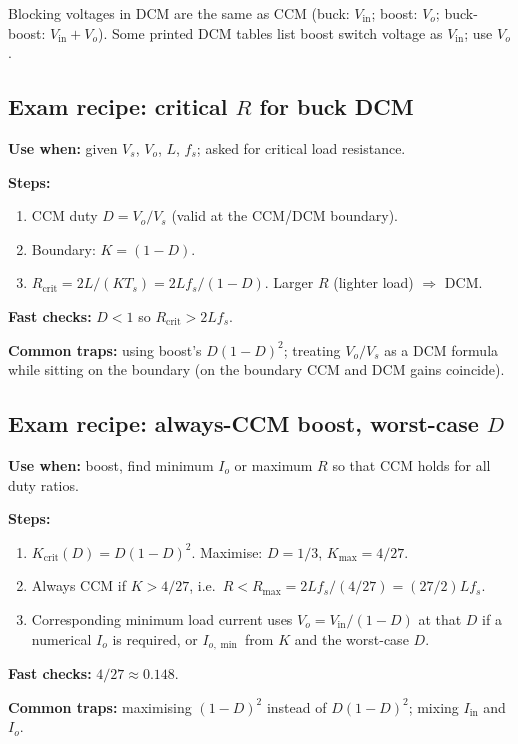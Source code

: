 Blocking voltages in DCM are the same as CCM (buck: \(V_{\mathrm{in}}\); boost: \(V_o\); buck-boost: \(V_{\mathrm{in}}+V_o\)). Some printed DCM tables list boost switch voltage as \(V_{\mathrm{in}}\); use \(V_o\).

\subsection{Exam recipe: critical \(R\) for buck DCM}
\textbf{Use when:} given \(V_s\), \(V_o\), \(L\), \(f_s\); asked for critical load resistance.

\textbf{Steps:}
\begin{enumerate}
  \item CCM duty \(D=V_o/V_s\) (valid at the CCM/DCM boundary).
  \item Boundary: \(K=(1-D)\).
  \item \(R_{\mathrm{crit}}=2L/(K T_s)=2L f_s/(1-D)\). Larger \(R\) (lighter load) \(\Rightarrow\) DCM.
\end{enumerate}

\textbf{Fast checks:} \(D<1\) so \(R_{\mathrm{crit}}>2Lf_s\).

\textbf{Common traps:} using boost's \(D(1-D)^2\); treating \(V_o/V_s\) as a DCM formula while sitting on the boundary (on the boundary CCM and DCM gains coincide).

\subsection{Exam recipe: always-CCM boost, worst-case \(D\)}
\textbf{Use when:} boost, find minimum \(I_o\) or maximum \(R\) so that CCM holds for all duty ratios.

\textbf{Steps:}
\begin{enumerate}
  \item \(K_{\mathrm{crit}}(D)=D(1-D)^2\). Maximise: \(D=1/3\), \(K_{\mathrm{max}}=4/27\).
  \item Always CCM if \(K>4/27\), i.e.\ \(R<R_{\mathrm{max}}=2L f_s/(4/27)= (27/2) L f_s\).
  \item Corresponding minimum load current uses \(V_o=V_{\mathrm{in}}/(1-D)\) at that \(D\) if a numerical \(I_o\) is required, or \(I_{o,\min}\) from \(K\) and the worst-case \(D\).
\end{enumerate}

\textbf{Fast checks:} \(4/27\approx0.148\).

\textbf{Common traps:} maximising \((1-D)^2\) instead of \(D(1-D)^2\); mixing \(I_{\mathrm{in}}\) and \(I_o\).

